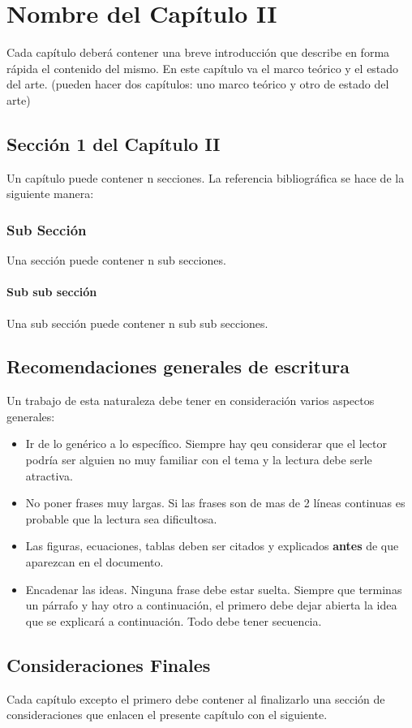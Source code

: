 \chapter{Nombre del Capítulo II}

Cada capítulo deberá contener una breve introducción que describe en forma rápida el contenido del
mismo. En este capítulo va el marco teórico y el estado del arte. (pueden hacer dos capítulos: uno marco teórico y otro de estado del arte)

\section{Sección 1 del Capítulo II}

Un capítulo puede contener n secciones. La referencia bibliográfica se hace de la siguiente manera:
\cite{Mateos00}

\subsection{Sub Sección}

Una sección puede contener n sub secciones.\cite{Galante01}

\subsubsection{Sub sub sección}

Una sub sección puede contener n sub sub secciones.

\section{Recomendaciones generales de escritura}
Un trabajo de esta naturaleza debe tener en consideración varios aspectos generales:

\begin{itemize}
\item Ir de lo genérico a lo específico. Siempre hay qeu considerar que el lector podría ser alguien no muy familiar con el tema 
y la lectura debe serle atractiva.
\item No poner frases muy largas. Si las frases son de mas de 2 líneas continuas es probable que la lectura sea dificultosa.
\item Las figuras, ecuaciones, tablas deben ser citados y explicados {\bf antes} de que aparezcan en el documento.
\item Encadenar las ideas. Ninguna frase debe estar suelta. Siempre que terminas un párrafo y hay otro a continuación, 
el primero debe dejar abierta la idea que se explicará a continuación. Todo debe tener secuencia.
\end{itemize}


\section{Consideraciones Finales}

Cada capítulo excepto el primero debe contener al finalizarlo una sección de consideraciones que enlacen
el presente capítulo con el siguiente.
